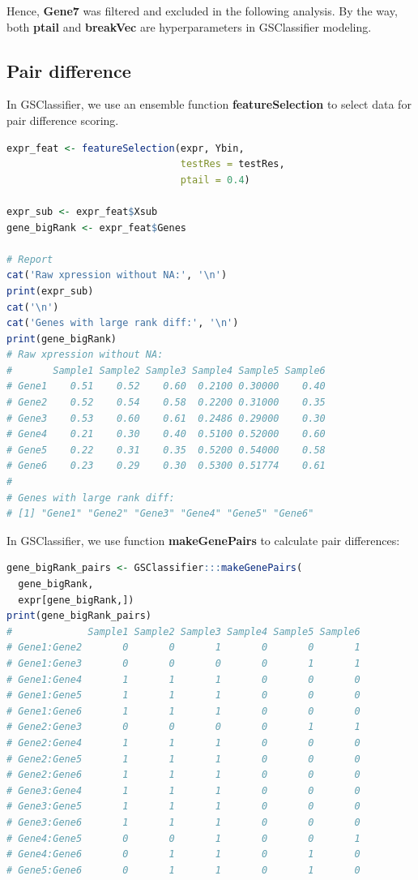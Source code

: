 \documentclass[
  12pt,
]{book}
\begin{document}
Hence, \textbf{Gene7} was filtered and excluded in the following analysis. By the way, both \textbf{ptail} and \textbf{breakVec} are hyperparameters in GSClassifier modeling.

\hypertarget{pair-difference}{%
\subsection{Pair difference}\label{pair-difference}}

In GSClassifier, we use an ensemble function \textbf{featureSelection} to select data for pair difference scoring.

\begin{lstlisting}[language=R]
expr_feat <- featureSelection(expr, Ybin,
                              testRes = testRes,
                              ptail = 0.4)

expr_sub <- expr_feat$Xsub
gene_bigRank <- expr_feat$Genes

# Report
cat('Raw xpression without NA:', '\n')
print(expr_sub)
cat('\n')
cat('Genes with large rank diff:', '\n')
print(gene_bigRank)
# Raw xpression without NA: 
#       Sample1 Sample2 Sample3 Sample4 Sample5 Sample6
# Gene1    0.51    0.52    0.60  0.2100 0.30000    0.40
# Gene2    0.52    0.54    0.58  0.2200 0.31000    0.35
# Gene3    0.53    0.60    0.61  0.2486 0.29000    0.30
# Gene4    0.21    0.30    0.40  0.5100 0.52000    0.60
# Gene5    0.22    0.31    0.35  0.5200 0.54000    0.58
# Gene6    0.23    0.29    0.30  0.5300 0.51774    0.61
# 
# Genes with large rank diff: 
# [1] "Gene1" "Gene2" "Gene3" "Gene4" "Gene5" "Gene6"
\end{lstlisting}

In GSClassifier, we use function \textbf{makeGenePairs} to calculate pair differences:

\begin{lstlisting}[language=R]
gene_bigRank_pairs <- GSClassifier:::makeGenePairs(
  gene_bigRank, 
  expr[gene_bigRank,])
print(gene_bigRank_pairs)
#             Sample1 Sample2 Sample3 Sample4 Sample5 Sample6
# Gene1:Gene2       0       0       1       0       0       1
# Gene1:Gene3       0       0       0       0       1       1
# Gene1:Gene4       1       1       1       0       0       0
# Gene1:Gene5       1       1       1       0       0       0
# Gene1:Gene6       1       1       1       0       0       0
# Gene2:Gene3       0       0       0       0       1       1
# Gene2:Gene4       1       1       1       0       0       0
# Gene2:Gene5       1       1       1       0       0       0
# Gene2:Gene6       1       1       1       0       0       0
# Gene3:Gene4       1       1       1       0       0       0
# Gene3:Gene5       1       1       1       0       0       0
# Gene3:Gene6       1       1       1       0       0       0
# Gene4:Gene5       0       0       1       0       0       1
# Gene4:Gene6       0       1       1       0       1       0
# Gene5:Gene6       0       1       1       0       1       0
\end{lstlisting}
\end{document}
